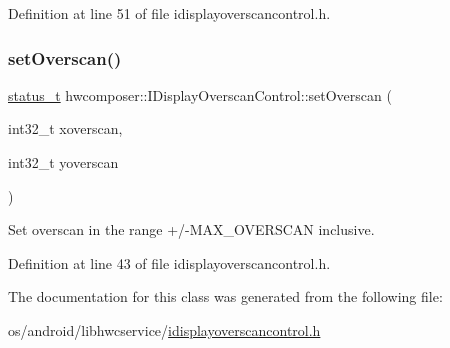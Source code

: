 Definition at line 51 of file idisplayoverscancontrol.\+h.


\begin{DoxyCode}{0}
\end{DoxyCode}
\mbox{\label{classhwcomposer_1_1IDisplayOverscanControl_ae337988f284dbbf6844c814203d44d60}} 
\subsubsection{\texorpdfstring{set\+Overscan()}{setOverscan()}}
{\footnotesize\ttfamily \mbox{\hyperlink{hwcserviceapi_8h_a3806fb2027d9a316d8ca8d9b8b8eb96f}{status\+\_\+t}} hwcomposer\+::\+I\+Display\+Overscan\+Control\+::set\+Overscan (\begin{DoxyParamCaption}\item[{int32\+\_\+t}]{xoverscan,  }\item[{int32\+\_\+t}]{yoverscan }\end{DoxyParamCaption})\hspace{0.3cm}{\ttfamily [inline]}}



Set overscan in the range +/-\/M\+A\+X\+\_\+\+O\+V\+E\+R\+S\+C\+AN inclusive. 



Definition at line 43 of file idisplayoverscancontrol.\+h.


\begin{DoxyCode}{0}
\end{DoxyCode}


The documentation for this class was generated from the following file\+:\begin{DoxyCompactItemize}
\item 
os/android/libhwcservice/\mbox{\hyperlink{idisplayoverscancontrol_8h}{idisplayoverscancontrol.\+h}}\end{DoxyCompactItemize}
